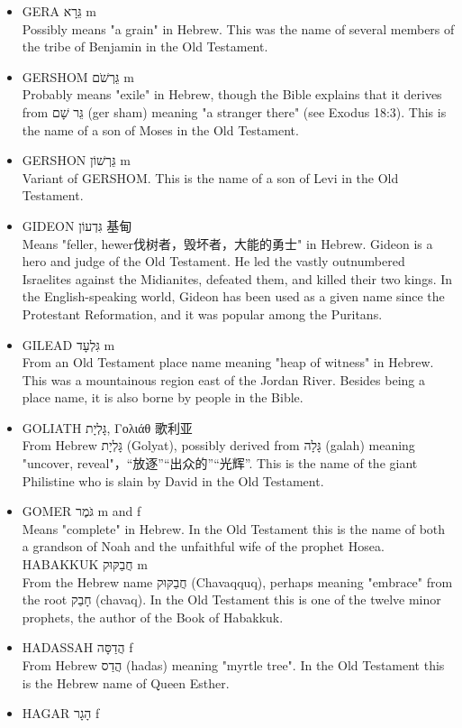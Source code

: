 \begin{itemize}
\item GERA גֵּרָא m \\
Possibly means "a grain" in Hebrew. This was the name of several members of the tribe of Benjamin in the Old Testament.
\item GERSHOM גֵּרְשֹׁם m\\
Probably means "exile" in Hebrew, though the Bible explains that it derives from גֵּר שָׁם (ger sham) meaning "a stranger there" (see Exodus 18:3). This is the name of a son of Moses in the Old Testament.
\item GERSHON גֵּרְשׁוֹן m\\
Variant of GERSHOM. This is the name of a son of Levi in the Old Testament.
\item GIDEON גִּדְעוֹן 基甸 \\
Means "feller, hewer伐树者，毁坏者，大能的勇士" in Hebrew. Gideon is a hero and judge of the Old Testament. He led the vastly outnumbered Israelites against the Midianites, defeated them, and killed their two kings. In the English-speaking world, Gideon has been used as a given name since the Protestant Reformation, and it was popular among the Puritans.
\item GILEAD גִּלְעָד m \\
From an Old Testament place name meaning "heap of witness" in Hebrew. This was a mountainous region east of the Jordan River. Besides being a place name, it is also borne by people in the Bible.
\item GOLIATH גָּלְיָת, Γολιάθ 歌利亚\\
From Hebrew גָּלְיָת (Golyat), possibly derived from גָּלָה (galah) meaning "uncover, reveal"，“放逐”“出众的”“光辉”. This is the name of the giant Philistine who is slain by David in the Old Testament.
\item GOMER גֹּמֶר m and f\\
Means "complete" in Hebrew. In the Old Testament this is the name of both a grandson of Noah and the unfaithful wife of the prophet Hosea.
HABAKKUK חֲבַקּוּק m \\
From the Hebrew name חֲבַקּוּק (Chavaqquq), perhaps meaning "embrace" from the root חָבַק (chavaq). In the Old Testament this is one of the twelve minor prophets, the author of the Book of Habakkuk.
\item HADASSAH הֲדַסָּה f\\
From Hebrew הֲדַס (hadas) meaning "myrtle tree". In the Old Testament this is the Hebrew name of Queen Esther.
\item HAGAR הָגָר f \\

\end{itemize}
